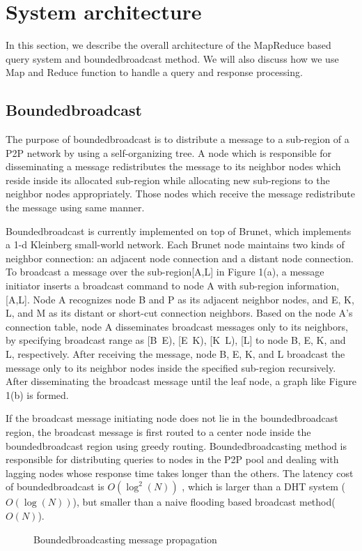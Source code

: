 \documentclass{acm_proc_article-sp}
\begin{document}
\section{System architecture}
In this section, we describe the overall architecture of the MapReduce based query system and boundedbroadcast method. 
We will also discuss how we use Map and Reduce function to handle a query and response processing.
\subsection{Boundedbroadcast}
The purpose of boundedbroadcast\cite{deetoo} is to distribute a message to a sub-region of a P2P network by using a self-organizing tree.
A node which is responsible for disseminating a message redistributes the message to its neighbor nodes which reside inside its allocated sub-region while allocating new sub-regions to the neighbor nodes appropriately.
Those nodes which receive the message redistribute the message using same manner.

Boundedbroadcast is currently implemented on top of Brunet\cite{brunet}, which implements a 1-d Kleinberg small-world network.
Each Brunet node maintains two kinds of neighbor connection: an adjacent node connection and a distant node connection.
To broadcast a message over the sub-region[A,L] in Figure 1(a), a message initiator inserts a broadcast command to node A with sub-region information, [A,L]. 
Node A recognizes node B and P as its adjacent neighbor nodes, and  E, K, L, and M as its distant or short-cut connection neighbors.
Based on the node A's connection table, node A disseminates broadcast messages only to its neighbors, by specifying broadcast range as [B~E), [E~K), [K~L), [L] to node B, E, K, and L, respectively.
After receiving the message, node B, E, K, and L broadcast the message only to its neighbor nodes inside the specified sub-region recursively. 
After disseminating the broadcast message until the leaf node, a graph like Figure 1(b) is formed.

If the broadcast message initiating node does not lie in the boundedbroadcast region, the broadcast message is first routed to a center node inside the boundedbroadcast region using greedy routing.
Boundedbroadcasting method is responsible for distributing queries to nodes in the P2P pool and dealing with lagging nodes whose response time takes longer than the others. 
The latency cost of boundedbroadcast is  $O(\log^2(N))$ \cite{deetoo}, which is larger than a DHT system ($O(\log(N))$)\cite{chord}, but smaller than a naive flooding based broadcast method($O(N)$).
\begin{figure}
\centering
{}
\caption{Boundedbroadcasting message propagation}
\end{figure}
\end{document}
